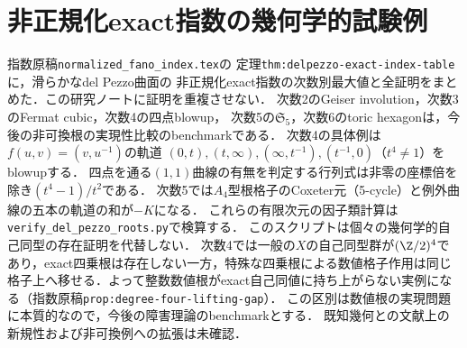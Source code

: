 \documentclass[11pt,a4paper]{ltjsarticle}
\begin{document}
\section{非正規化exact指数の幾何学的試験例}
指数原稿\texttt{normalized\_fano\_index.tex}の
定理\texttt{thm:delpezzo-exact-index-table}に，滑らかなdel Pezzo曲面の
非正規化exact指数の次数別最大値と全証明をまとめた．この研究ノートに証明を重複させない．
次数2のGeiser involution，次数3のFermat cubic，次数4の四点blowup，
次数5の$\mathfrak S_5$，次数6のtoric hexagonは，今後の非可換根の実現性比較のbenchmarkである．
次数4の具体例は$f(u,v)=(v,u^{-1})$の軌道
$(0,t),(t,\infty),(\infty,t^{-1}),(t^{-1},0)$（$t^4\ne1$）をblowupする．
四点を通る$(1,1)$曲線の有無を判定する行列式は非零の座標倍を除き$(t^4-1)/t^2$である．
次数5では$A_4$型根格子のCoxeter元（5-cycle）と例外曲線の五本の軌道の和が$-K$になる．
これらの有限次元の因子類計算は\texttt{verify\_del\_pezzo\_roots.py}で検算する．
このスクリプトは個々の幾何学的自己同型の存在証明を代替しない．
次数4では一般の$X$の自己同型群が$(\Z/2)^4$であり，exact四乗根は存在しない一方，特殊な四乗根による数値格子作用は同じ格子上へ移せる．よって整数数値根がexact自己同値に持ち上がらない実例になる（指数原稿\texttt{prop:degree-four-lifting-gap}）．
この区別は数値根の実現問題に本質的なので，今後の障害理論のbenchmarkとする．
既知幾何との文献上の新規性および非可換例への拡張は未確認．
\end{document}
